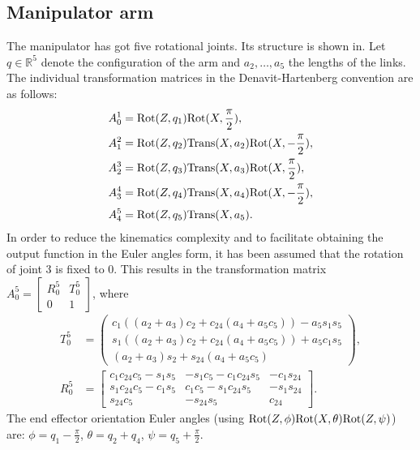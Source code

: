 \subsection{Manipulator arm}
The manipulator has got five rotational joints. Its structure is shown in. %
Let $q\in \mathbb{R}^5$ denote the configuration of the arm and $a_2, \dots, a_5$ the lengths of the links. The individual transformation matrices in the Denavit-Hartenberg convention are as follows:
\begin{equation}
\begin{aligned}
A_0^1 &= \mathrm{Rot}(Z, q_1)\mathrm{Rot}(X, \frac{\pi}{2}),\\
A_1^2 &= \mathrm{Rot}(Z, q_2)\mathrm{Trans} (X, a_2)\mathrm{Rot}(X, -\frac{\pi}{2}),\\
A_2^3 &= \mathrm{Rot}(Z, q_3)\mathrm{Trans} (X, a_3)\mathrm{Rot}(X, \frac{\pi}{2}),\\
A_3^4 &= \mathrm{Rot}(Z, q_4)\mathrm{Trans} (X, a_4)\mathrm{Rot}(X, -\frac{\pi}{2}),\\
A_4^5 &= \mathrm{Rot}(Z, q_5)\mathrm{Trans} (X, a_5).
\end{aligned}
\end{equation}
In order to reduce the kinematics complexity and to facilitate obtaining the output function in the Euler angles form, it has been assumed that the rotation of joint 3 is fixed to $0$. This results in the transformation matrix $
A_0^5=\begin{bmatrix}
R_0^5 & T_0^5\\
0 & 1
\end{bmatrix}$, 
where
\begin{align}
T_0^5 &= \begin{pmatrix}
c_1\left((a_2+a_3)c_2 + c_{24}(a_4+a_5c_5)\right) - a_5s_1s_5\\
s_1\left((a_2+a_3)c_2 + c_{24}(a_4+a_5c_5)\right) + a_5c_1s_5\\
    (a_2+a_3)s_2 + s_{24}(a_4+a_5c_5)
\end{pmatrix},\\
R_0^5 &= \begin{bmatrix}
c_1c_{24}c_5-s_1s_5 & -s_1c_5-c_1c_{24}s_5 & -c_1s_{24}\\
s_1c_{24}c_5-c_1s_5 &  c_1c_5-s_1c_{24}s_5 & -s_1s_{24}\\
s_{24}c_5           & -s_{24}s_5           &  c_{24}
\end{bmatrix}.
\end{align}
The end effector orientation Euler angles (using $\mathrm{Rot}(Z,\phi)\mathrm{Rot}(X, \theta)\mathrm{Rot}(Z, \psi)$) are: $\phi=q_1-\frac{\pi}{2}$, $\theta=q_2+q_4$, $\psi=q_5+\frac{\pi}{2}$.

